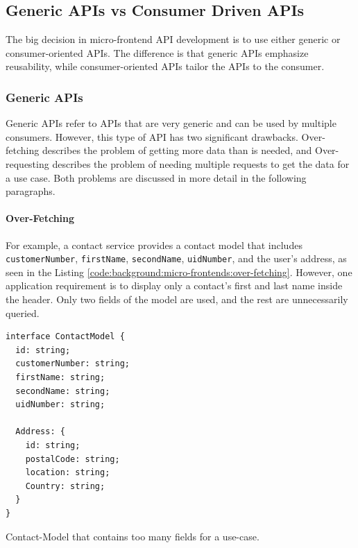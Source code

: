 \subsection{Generic APIs vs Consumer Driven APIs}\label{subsection:background:micro-frontend:generic-vs-consumer-driven-apis}

The big decision in micro-frontend \ac{API} development is to use either generic or consumer-oriented \acp{API}. The difference is that generic \acp{API} emphasize reusability, while consumer-oriented \acp{API} tailor the \acp{API} to the consumer.

\subsubsection{Generic \acp{API}}\label{subsubsection:background:micro-frontend:generic-vs-consumer-driven-apis:generic-apis}

Generic \acp{API} refer to \acp{API} that are very generic and can be used by multiple consumers. However, this type of \ac{API} has two significant drawbacks. Over-fetching describes the problem of getting more data than is needed, and Over-requesting describes the problem of needing multiple requests to get the data for a use case. Both problems are discussed in more detail in the following paragraphs. \cite{misc:2019:leitner:background:micro-frontends:backend-for-frontends}

\paragraph{Over-Fetching}\label{paragraph:background:micro-frontend:generic-vs-consumer-driven-apis:generic-apis:over-fetching}

For example, a contact service provides a contact model that includes \texttt{customerNumber}, \texttt{firstName}, \texttt{secondName}, \texttt{uidNumber}, and the user's address, as seen in the Listing \ref{code:background:micro-frontends:over-fetching}. However, one application requirement is to display only a contact's first and last name inside the header. Only two fields of the model are used, and the rest are unnecessarily queried. \cite{misc:2019:leitner:background:micro-frontends:backend-for-frontends}

\ifshowListings
\begin{listing}[H]
  \begin{verbatim}
interface ContactModel {
  id: string;
  customerNumber: string;
  firstName: string;
  secondName: string;
  uidNumber: string;

  Address: {
    id: string;
    postalCode: string;
    location: string;
    Country: string;
  }
}
  \end{verbatim}
  \caption{Contact-Model that contains too many fields for a use-case.}\label{code:background:micro-frontends:over-fetching}
\end{listing}
\fi

